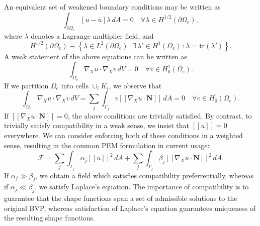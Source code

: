 An equivalent set of weakened boundary conditions may be written as
\begin{equation}
	\int_{\partial \Omega_e} \left[ u - \bar{u} \right] \lambda \, dA = 0 \quad \forall \lambda \in H^{1/2} (\partial \Omega_e),
\end{equation}
where $\lambda$ denotes a Lagrange multiplier field, and
\begin{equation}
	H^{1/2} (\partial \Omega_e) \equiv \left\{ \lambda \in L^2 (\partial \Omega_e) \, | \, \exists \, \lambda' \in H^1 (\Omega_e) \, \colon \lambda = \text{tr} (\lambda') \right\}.
\end{equation}
A weak statement of the above equations can be written as
\begin{equation}
	\int_{\Omega_e} \nabla_X u \cdot \nabla_X v \, dV = 0 \quad \forall v \in H^1_0(\Omega_e).
\end{equation}
If we partition $\Omega_e$ into cells $\cup_i K_i$, we observe that
\begin{equation}
	\int_{\Omega_e} \nabla_X u \cdot \nabla_X v \, dV = \sum_j \int_{\Gamma_j} v [\![ \nabla_X u \cdot \mathbf{N} ]\!] \, dA = 0 \quad \forall v \in H^1_0(\Omega_e).
\end{equation}
If $[\![ \nabla_X u \cdot \mathbf{N} ]\!] = 0$, the above conditions are trivially satisfied. By contrast, to trivially satisfy compatibility in a weak sense, we insist that $[\![ u ]\!] = 0$ everywhere. We can consider enforcing both of these conditions in a weighted sense, resulting in the common PEM formulation in current usage:
\begin{equation}
	\mathcal{F} = \sum_j \int_{\Gamma_j} \alpha_j [\![ u]\!]^2 \, dA + \sum_j \int_{\Gamma_j} \beta_j [\![ \nabla_X u \cdot \mathbf{N} ]\!]^2 \, dA.
\end{equation}
If $\alpha_j \gg \beta_j$, we obtain a field which satisfies compatibility preferrentially, whereas if $\alpha_j \ll \beta_j$, we satisfy Laplace's equation. The importance of compatibility is to guarantee that the shape functions span a set of admissible solutions to the original BVP, whereas satisfaction of Laplace's equation guarantees uniqueness of the resulting shape functions.

